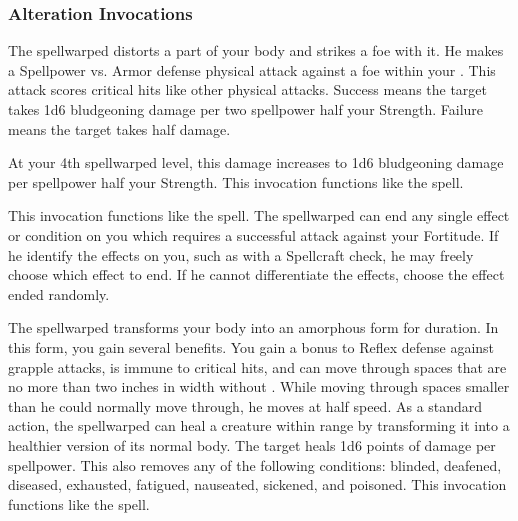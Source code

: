         \subsubsection{Alteration Invocations}
            The spellwarped distorts a part of your body and strikes a foe with it.
            He makes a Spellpower vs. Armor defense physical attack against a foe within your .
            This attack scores critical hits like other physical attacks.
            Success means the target takes 1d6 bludgeoning damage per two spellpower \add half your Strength.
            Failure means the target takes half damage.
            \par At your 4th spellwarped level, this damage increases to 1d6 bludgeoning damage per spellpower \add half your Strength.
            This invocation functions like the  spell.

            This invocation functions like the  spell.
            The spellwarped can end any single effect or condition on you which requires a successful attack against your Fortitude.
            If he identify the effects on you, such as with a Spellcraft check, he may freely choose which effect to end.
            If he cannot differentiate the effects, choose the effect ended randomly.

            The spellwarped transforms your body into an amorphous form for \durshort duration.
            In this form, you gain several benefits.
            You gain a  bonus to Reflex defense against grapple attacks, is immune to critical hits, and can move through spaces that are no more than two inches in width without .
            While moving through spaces smaller than he could normally move through, he moves at half speed.
            As a standard action, the spellwarped can heal a creature within \rngclose range by transforming it into a healthier version of its normal body.
            The target heals 1d6 points of damage per spellpower.
            This also removes any of the following conditions: blinded, deafened, diseased, exhausted, fatigued, nauseated, sickened, and poisoned.
            This invocation functions like the  spell.


